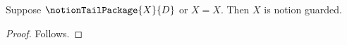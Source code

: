 

\begin{proposition}\label{notion_package_disjunction}
    Suppose $\notionTailPackage{X}{D}$ or $X=X$.
    Then $X$ is notion guarded.
\end{proposition}
\begin{proof}
    Follows.
\end{proof}
